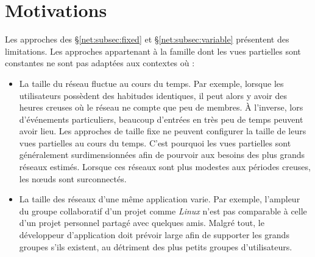 
\section{Motivations}
\label{net:sec:motivations}

Les approches des §\ref{net:subsec:fixed} et §\ref{net:subsec:variable} présentent des
limitations. Les approches appartenant à la famille dont les vues partielles
sont constantes ne sont pas adaptées aux contextes où :
\begin{itemize}
\item La taille du réseau fluctue au cours du temps. Par exemple, lorsque les
  utilisateurs possèdent des habitudes identiques, il peut alors y avoir des
  heures creuses où le réseau ne compte que peu de membres. À l'inverse, lors
  d'événements particuliers, beaucoup d'entrées en très peu de temps peuvent
  avoir lieu.  Les approches de taille fixe ne peuvent configurer la taille de
  leurs vues partielles au cours du temps. C'est pourquoi les vues partielles
  sont généralement surdimensionnées afin de pourvoir aux besoins des plus
  grands réseaux estimés. Lorsque ces réseaux sont plus modestes aux périodes
  creuses, les nœuds sont surconnectés.
\item La taille des réseaux d'une même application varie. Par exemple, l'ampleur
  du groupe collaboratif d'un projet comme \emph{Linux} n'est pas comparable à
  celle d'un projet personnel partagé avec quelques amis. Malgré tout, le
  développeur d'application doit prévoir large afin de supporter les grands
  groupes s'ils existent, au détriment des plus petits groupes d'utilisateurs.
\end{itemize}



